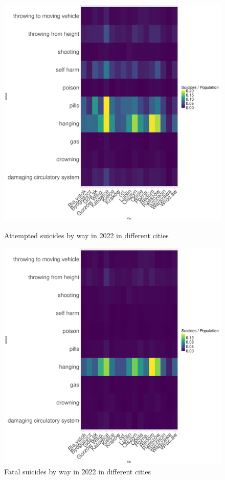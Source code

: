 \documentclass{article}
\begin{document}
\begin{figure}[H]
    \centering
    \begin{minipage}{0.45\textwidth}
        \includegraphics[width=\textwidth]{imgs/way_city_op-att-2022.pdf}
        \caption{Attempted suicides by way  in 2022 in different cities}
	\label{way_city_op-att-2022}
    \end{minipage}
    \hfill
    \begin{minipage}{0.45\textwidth}
        \includegraphics[width=\textwidth]{imgs/way_city_op-fat-2022.pdf}
        \caption{Fatal suicides by way  in 2022 in different cities}
	\label{way_city_op-fat-2022}
    \end{minipage}
\end{figure}
%
%
%
%
\end{document}
